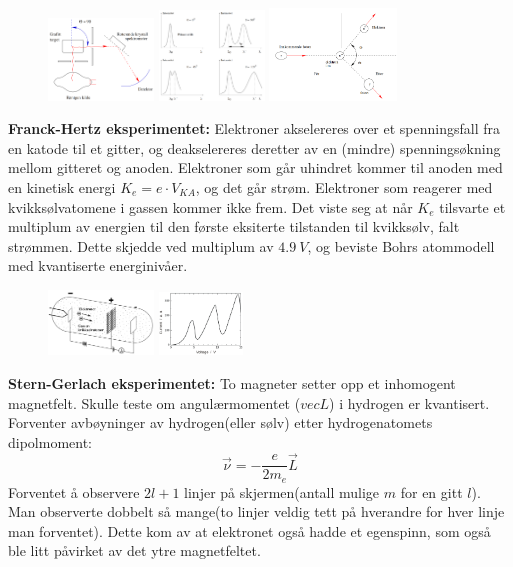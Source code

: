 \documentclass[10p,a4paper]{extarticle}
\begin{document}
\begin{multicols}{2}
\begin{figure}[H]
\includegraphics[width=0.25\textwidth]{compton.png}
\includegraphics[width=0.25\textwidth]{compton2.png}
\includegraphics[width=0.3\textwidth]{compton3.png}
\end{figure}


\textbf{Franck-Hertz eksperimentet:} Elektroner akselereres over et spenningsfall fra en katode til et gitter, og deakselereres deretter av en (mindre) spenningsøkning mellom gitteret og anoden. Elektroner som går uhindret kommer til anoden med en kinetisk energi $K_e = e\cdot V_{KA}$, og det går strøm. Elektroner som reagerer med kvikksølvatomene i gassen kommer ikke frem. Det viste seg at når $K_e$ tilsvarte et multiplum av energien til den første eksiterte tilstanden til kvikksølv, falt strømmen. Dette skjedde ved multiplum av $\SI{4.9}{V}$, og beviste Bohrs atommodell med kvantiserte energinivåer.
\begin{figure}[H]
\includegraphics[width=0.25\textwidth]{FranckHertz.png}
\includegraphics[width=0.2\textwidth]{FranckHertz2.png}
\end{figure}

\textbf{Stern-Gerlach eksperimentet:} To magneter setter opp et inhomogent magnetfelt. Skulle teste om angulærmomentet ($vec{L}$) i hydrogen er kvantisert. Forventer avbøyninger av hydrogen(eller sølv) etter hydrogenatomets dipolmoment:
\[ \vec{\nu} = -\frac{e}{2m_e}\vec{L} \]
Forventet å observere $2l+1$ linjer på skjermen(antall mulige $m$ for en gitt $l$). Man observerte dobbelt så mange(to linjer veldig tett på hverandre for hver linje man forventet). Dette kom av at elektronet også hadde et egenspinn, som også ble litt påvirket av det ytre magnetfeltet.


\end{multicols}
\end{document}

